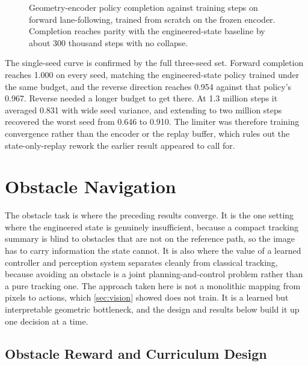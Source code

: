 \begin{figure}[H]
    \centering
    \caption{Geometry-encoder policy completion against training steps on forward lane-following, trained from scratch on the frozen encoder. Completion reaches parity with the engineered-state baseline by about 300 thousand steps with no collapse.}
    \label{fig:geometry_rl_curve}
\end{figure}

The single-seed curve is confirmed by the full three-seed set. Forward completion reaches 1.000 on every seed, matching the engineered-state policy trained under the same budget, and the reverse direction reaches 0.954 against that policy's 0.967. Reverse needed a longer budget to get there. At 1.3 million steps it averaged 0.831 with wide seed variance, and extending to two million steps recovered the worst seed from 0.646 to 0.910. The limiter was therefore training convergence rather than the encoder or the replay buffer, which rules out the state-only-replay rework the earlier result appeared to call for.

\section{Obstacle Navigation}
\label{sec:obstacle_results}

The obstacle task is where the preceding results converge. It is the one setting where the engineered state is genuinely insufficient, because a compact tracking summary is blind to obstacles that are not on the reference path, so the image has to carry information the state cannot. It is also where the value of a learned controller and perception system separates cleanly from classical tracking, because avoiding an obstacle is a joint planning-and-control problem rather than a pure tracking one. The approach taken here is not a monolithic mapping from pixels to actions, which \cref{sec:vision} showed does not train. It is a learned but interpretable geometric bottleneck, and the design and results below build it up one decision at a time.

\subsection{Obstacle Reward and Curriculum Design}
\label{sec:obstacle_reward}

